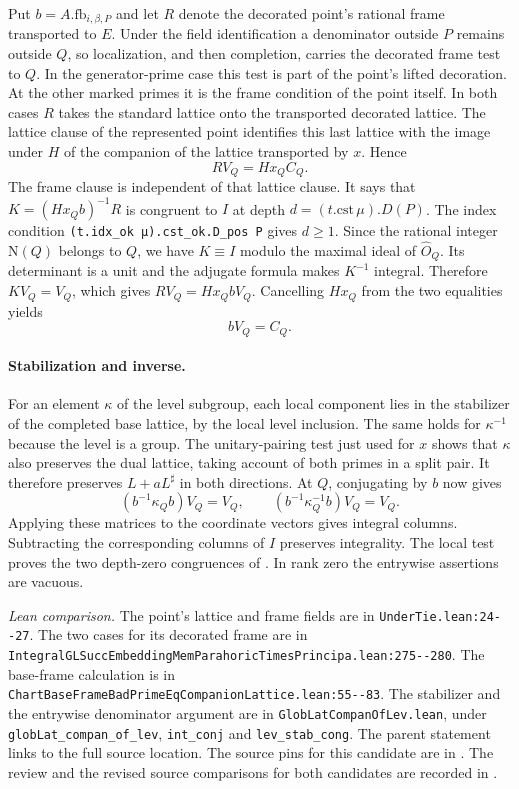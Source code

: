 Put $b=A.\mathrm{fb}_{i,\beta,P}$ and let
$R$ denote the decorated point's rational frame transported to $E$.
Under the field identification a denominator outside $P$ remains outside
$Q$, so localization, and then completion, carries the decorated frame
test to $Q$. In the generator-prime case this test is part of the
point's lifted decoration. At the other marked primes it is the frame
condition of the point itself. In both cases $R$ takes the standard
lattice onto the transported decorated lattice. The lattice clause
of the represented point identifies this last lattice with the image
under $H$ of the companion of the lattice transported by $x$. Hence
\[
                  R V_Q=H x_Q C_Q .
\]
The frame clause is independent of that lattice clause. It says that
$K=(H x_Q b)^{-1}R$ is congruent to $I$ at depth $d=(t.\mathrm{cst}\,\mu).D(P)$. The index condition
\nolinkurl{(t.idx_ok μ).cst_ok.D_pos P} gives $d\ge1$.
Since the rational integer $\mathrm N(Q)$ belongs to $Q$, we have
$K\equiv I$ modulo the maximal ideal of $\widehat O_Q$.
Its determinant is a unit and the adjugate formula makes $K^{-1}$
integral. Therefore $K V_Q=V_Q$, which gives
$R V_Q=H x_Q b V_Q$. Cancelling $H x_Q$ from the two equalities yields
\[
                              b V_Q=C_Q .
\]

\paragraph{Stabilization and inverse.}
For an element $\kappa$ of the level subgroup, each local component
lies in the stabilizer of the completed base lattice, by the local
level inclusion. The same holds for $\kappa^{-1}$ because the level is a
group. The unitary-pairing test just used for $x$ shows that $\kappa$
also preserves the dual lattice, taking account of both primes in a
split pair. It therefore preserves $L+aL^\sharp$ in both directions.
At $Q$, conjugating by $b$ now gives
\[
 (b^{-1}\kappa_Q b)V_Q=V_Q,
 \qquad (b^{-1}\kappa_Q^{-1} b)V_Q=V_Q .
\]
Applying these matrices to the coordinate vectors gives integral
columns. Subtracting the corresponding columns of $I$ preserves
integrality. The local test proves the two depth-zero congruences of
. In rank zero the entrywise assertions are vacuous.

\smallskip
\noindent\textit{Lean comparison.}
The point's lattice and frame fields are in
\nolinkurl{UnderTie.lean:24--27}. The two cases for its decorated frame
are in \nolinkurl{IntegralGLSuccEmbeddingMemParahoricTimesPrincipa.lean:275--280}.
The base-frame calculation is in
\nolinkurl{ChartBaseFrameBadPrimeEqCompanionLattice.lean:55--83}.
The stabilizer and the entrywise denominator argument are in
\nolinkurl{GlobLatCompanOfLev.lean}, under
\nolinkurl{globLat_compan_of_lev}, \nolinkurl{int_conj} and
\nolinkurl{lev_stab_cong}. The parent statement links to the full
source location. The source pins for this candidate are in
. The review and the revised source comparisons for both candidates are recorded in .
